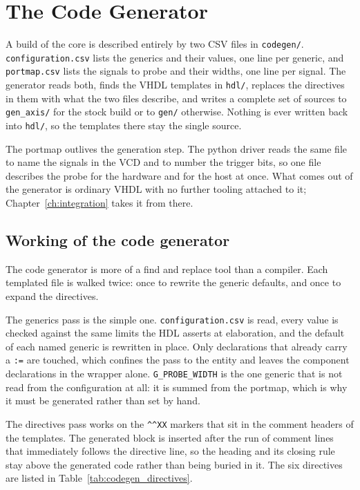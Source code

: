 \documentclass[../manual.tex]{subfiles}
\begin{document}
\chapter{The Code Generator}
\label{ch:codegen}

A build of the core is described entirely by two CSV files in \texttt{codegen/}. \texttt{configuration.csv} lists the generics and their values, one line per generic, and \texttt{portmap.csv} lists the signals to probe and their widths, one line per signal. The generator reads both, finds the VHDL templates in \texttt{hdl/}, replaces the directives in them with what the two files describe, and writes a complete set of sources to \texttt{gen\_axis/} for the stock build or to \texttt{gen/} otherwise. Nothing is ever written back into \texttt{hdl/}, so the templates there stay the single source.

The portmap outlives the generation step. The python driver reads the same file to name the signals in the VCD and to number the trigger bits, so one file describes the probe for the hardware and for the host at once. What comes out of the generator is ordinary VHDL with no further tooling attached to it; Chapter~\ref{ch:integration} takes it from there.

\section{Working of the code generator}
\label{sec:codegen_how}

The code generator is more of a find and replace tool than a compiler. Each templated file is walked twice: once to rewrite the generic defaults, and once to expand the directives.

The generics pass is the simple one. \texttt{configuration.csv} is read, every value is checked against the same limits the HDL asserts at elaboration, and the default of each named generic is rewritten in place. Only declarations that already carry a \texttt{:=} are touched, which confines the pass to the entity and leaves the component declarations in the wrapper alone. \texttt{G\_PROBE\_WIDTH} is the one generic that is not read from the configuration at all: it is summed from the portmap, which is why it must be generated rather than set by hand.

The directives pass works on the \texttt{\^{}\^{}XX} markers that sit in the comment headers of the templates. The generated block is inserted after the run of comment lines that immediately follows the directive line, so the heading and its closing rule stay above the generated code rather than being buried in it. The six directives are listed in Table~\ref{tab:codegen_directives}.
\end{document}
